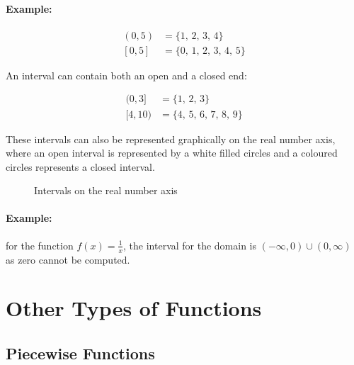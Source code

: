\documentclass[a5paper,9pt]{book}
\theoremstyle{definition}
\begin{document}
        \paragraph{Example:}

        \begin{align*}
            (0,5) &= \{1,\,2,\,3,\,4\} \\
            [0,5] &= \{0,\,1,\,2,\,3,\,4,\,5\}
        \end{align*}

        An interval can contain both an open and a closed end:

        \begin{align*}
            (0,3] &= \{1,\,2,\,3\} \\
            [4,10) &= \{4,\,5,\,6,\,7,\,8,\,9\}
        \end{align*}

        These intervals can also be represented graphically on the real number axis, 
        where an open interval is represented by a white filled circles and a coloured
        circles represents a closed interval.

        \begin{figure}[ht]
            \centering
            

            \bigskip

            
            \caption{Intervals on the real number axis}\label{fig:intervals_on_the_real_number_axis}
        \end{figure}

        \paragraph{Example:} for the function $f(x)=\frac{1}{x}$, the interval for the
        domain is $(-\infty,0)\cup(0,\infty)$ as zero cannot be computed.

        \pagebreak

        \section{Other Types of Functions}
        \label{sec:types_of_functions}

        \subsection{Piecewise Functions}
\end{document}
